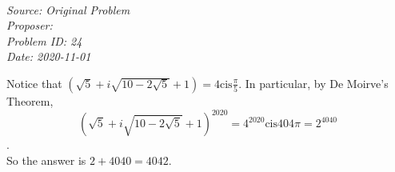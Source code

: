 \SSbreak\\
\emph{Source: Original Problem}\\
\emph{Proposer: \Ppi}\\
\emph{Problem ID: 24}\\
\emph{Date: 2020-11-01}\\
\SSbreak

\bigskip

\begin{solution}\hfil\medskip
    
    Notice that $ \left ( \sqrt{5} + i\sqrt{10-2\sqrt{5}} + 1 \right ) = 4 \mathrm{cis} \frac{\pi}{5}$. In particular, by De Moirve's Theorem, $$\left ( \sqrt{5} + i\sqrt{10-2\sqrt{5}} + 1 \right )^{2020} = 4^{2020} \mathrm{cis} {404\pi} = 2^{4040}$$.\\

    So the answer is $2 + 4040 = \boxed{4042}$. 
\end{solution}\bigskip